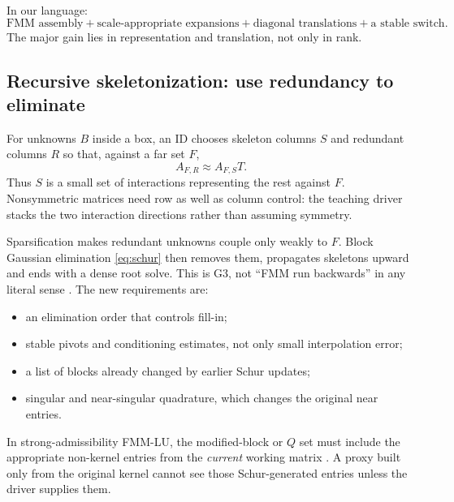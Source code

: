 In our language:
\[
\text{FMM assembly}+\text{scale-appropriate expansions}
+\text{diagonal translations}+\text{a stable switch}.
\]
The major gain lies in representation and translation, not only in rank.

\subsection{Recursive skeletonization: use redundancy to eliminate}
\label{sec:rskel}
For unknowns $B$ inside a box, an ID chooses skeleton columns $S$ and redundant columns $R$ so that, against a far set $F$,
\begin{equation}
 A_{F,R}\approx A_{F,S}T.
 \label{eq:idrelation}
\end{equation}
Thus $S$ is a small set of interactions representing the rest against $F$. Nonsymmetric matrices need row as well as column control: the teaching driver stacks the two interaction directions rather than assuming symmetry.

Sparsification makes redundant unknowns couple only weakly to $F$. Block Gaussian elimination \eqref{eq:schur} then removes them, propagates skeletons upward and ends with a dense root solve. This is G3, not ``FMM run backwards'' in any literal sense \cite{ho2012hife,minden2017rss}. The new requirements are:
\begin{itemize}
 \item an elimination order that controls fill-in;
 \item stable pivots and conditioning estimates, not only small interpolation error;
 \item a list of blocks already changed by earlier Schur updates;
 \item singular and near-singular quadrature, which changes the original near entries.
\end{itemize}
In strong-admissibility FMM-LU, the modified-block or $Q$ set must include the appropriate non-kernel entries from the \emph{current} working matrix \cite{sushnikova2023fmmlu}. A proxy built only from the original kernel cannot see those Schur-generated entries unless the driver supplies them.

